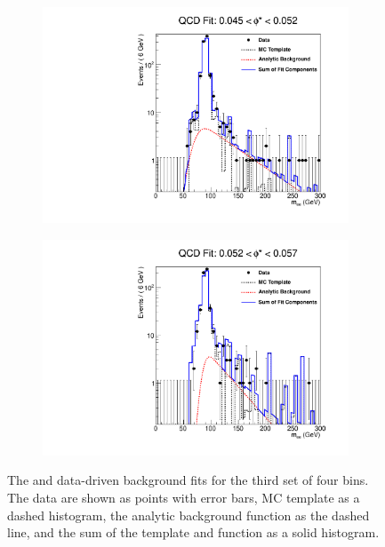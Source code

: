 \begin{figure}[!htbp]
\begin{subfigure}[b]{\SideBySidePlotWidth}
        \includegraphics[width=\linewidth]{figures/qcd_fits/qcd_fit_plot_for_11.pdf}
        \caption{}
        \label{fig:qcd_fit_11}
    \end{subfigure}%
    \begin{subfigure}[b]{\SideBySidePlotWidth}
        \includegraphics[width=\linewidth]{figures/qcd_fits/qcd_fit_plot_for_12.pdf}
        \caption{}
        \label{fig:qcd_fit_12}
    \end{subfigure}
    \caption[
       The \QCDjets and \wjets data-driven background fits for the third set of
       four \phistar bins.
    ]{
       The \QCDjets and \wjets data-driven background fits for the third set of
       four \phistar bins. The data are shown as points with error bars, MC
       template as a dashed histogram, the analytic background function as the
       dashed line, and the sum of the template and function as a solid
       histogram.
    }
    \label{fig:qcd_many_3}
\end{figure}


